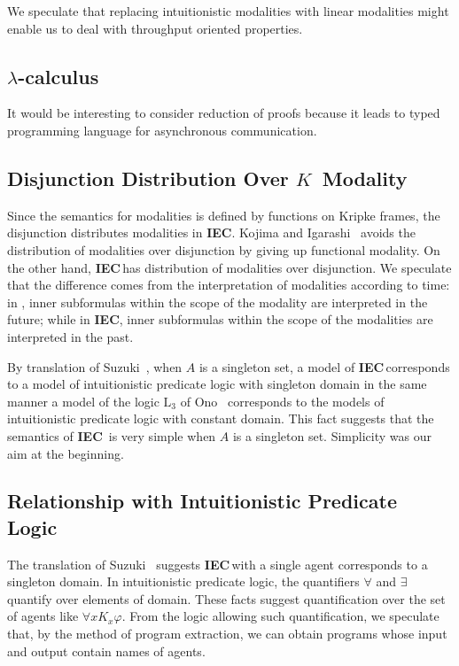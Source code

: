 \documentclass[doctor]{iscs-thesis}
\newcommand{\iec}{{\rm {\textbf{IEC}}}}
\begin{document}
We speculate that replacing intuitionistic modalities with
linear modalities might enable us to deal with throughput oriented properties.

\subsection{$\lambda$-calculus} 

It would be interesting to consider reduction of proofs
because it leads to typed programming language for asynchronous communication.

\subsection{Disjunction Distribution Over $K$~Modality}

Since the semantics for modalities is defined by functions on Kripke frames,
the disjunction distributes modalities in \iec.
Kojima and Igarashi~\cite{kojima2008constructive} avoids the distribution of modalities 
over disjunction by giving up functional modality.
On the other hand, \iec\,has distribution of modalities over disjunction.
We speculate that the difference comes from the interpretation of modalities according to
time:
in \cite{kojima2008constructive}, 
inner subformulas within the scope of the modality are interpreted in the future; while
in \iec, inner subformulas within the scope of the modalities are interpreted in the past.

By translation of Suzuki~\cite{suzuki1990kripke},
when $A$ is a singleton set, a model of \iec\,corresponds to 
a model of intuitionistic predicate logic with singleton domain
in the same manner a model of the logic 
$\mathrm L_3$ of Ono~\cite{hiroakira-some} corresponds to the models of
intuitionistic predicate logic with constant domain.
This fact suggests that the semantics of \iec\, is very simple when $A$ is a singleton set.
Simplicity was our aim at the beginning.

\subsection{Relationship with Intuitionistic Predicate Logic}

The translation of Suzuki~\cite{suzuki1990kripke} suggests
\iec\,with
a single agent corresponds to a singleton domain.
In intuitionistic predicate logic, the quantifiers $\forall$ and $\exists$ quantify over
elements of domain.
These facts suggest
quantification over the set of agents like $\forall x K_x\varphi$.
From the logic allowing such quantification,
we speculate that, by the method of program extraction,
we can obtain programs whose input and output contain names of agents.
\end{document}
